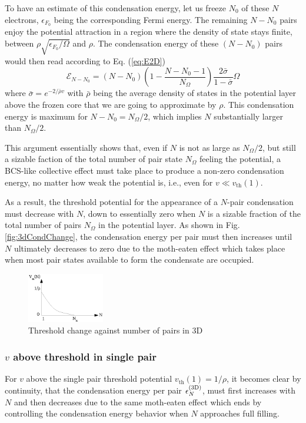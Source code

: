 \documentclass[aps,prb,showpacs,3p,twocolumn]{elsarticle}
\begin{document}
To have an estimate of this condensation energy, let us freeze $N_0$ of these $N$ electrons, $\epsilon_{F_{0}}$ being the corresponding Fermi energy.  The remaining $N-N_0$ pairs enjoy the potential attraction in a region where the density of state stays finite, between $\rho\sqrt{\epsilon_{F_0}/\Omega}$ and $\rho$.  The condensation energy of these $(N-N_0)$ pairs would then read according to Eq. (\ref{eq:E2D})
\begin{equation}\label{eq:E3D}
{\mathcal{E}}_{N-N_0}=(N-N_0)(1-\frac{N-N_0-1}{N_\Omega})\frac{2\bar\sigma}{1-\bar\sigma}\Omega
\end{equation}
where $\bar{\sigma}=e^{-2/{\bar{\rho}v}}$ with $\bar\rho$ being the average density of states in the potential layer above the frozen core that we are going to approximate by $\rho$. This condensation energy is maximum for $N-N_0=N_\Omega/2$, which implies  $N$ substantially larger than $N_\Omega/2$.

This argument essentially shows that, even if $N$ is not as large as $N_\Omega/2$, but still a sizable faction of the total number of pair state $N_\Omega$ feeling the potential,  a BCS-like collective effect  must take place to produce a non-zero condensation energy, no matter how weak the potential is, i.e., even for $v\ll{}v_\text{th}(1)$. 

As a result, the threshold potential for the appearance of a $N$-pair condensation  must decrease with $N$, down to essentially zero when $N$ is a sizable fraction of the total number of pairs $N_\Omega$ in the potential layer.  As shown in Fig. \ref{fig:3dCondChange}, the condensation energy per pair must then increases until $N$ ultimately decreases to zero due to the moth-eaten effect which takes place when most pair states available to form the condensate are occupied. 


\begin{figure}[htb]
	\centering
		\includegraphics[width=0.30\textwidth]{3dThresholdChange.eps}
	\caption{Threshold change against number of pairs in 3D}
	\label{fig:3dThresholdChange}
\end{figure}

\subsubsection{$v$ above threshold in single pair}
For $v$ above the single pair threshold potential $v_{\text{th}}(1)=1/\rho$, it becomes  clear by continuity, that the condensation energy per pair $\epsilon^{{\text{(3D)}}}_N$, must first increases with $N$ and then decreases due to the same moth-eaten effect which ends by controlling the condensation energy behavior when $N$ approaches full filling.  
\end{document}
